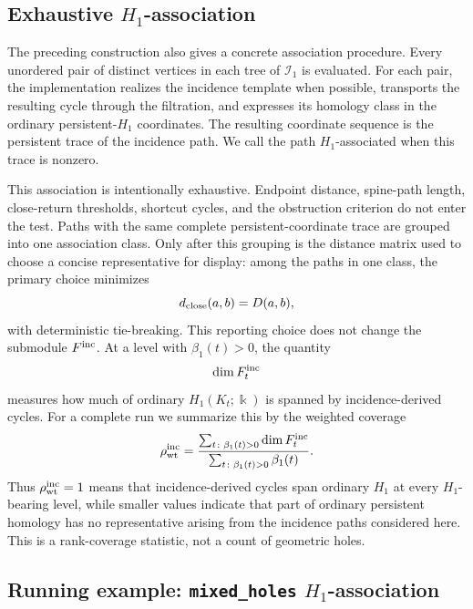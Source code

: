 \documentclass[a4paper,11pt]{article}
\theoremstyle{definition}
\theoremstyle{remark}
\begin{document}
\subsection{Exhaustive $H_1$-association}
\label{subsec:exhaustive-h1-association}

The preceding construction also gives a concrete association procedure.  Every unordered pair of distinct vertices in each tree of $\mathcal I_1$ is evaluated. For each pair, the implementation realizes the incidence template when possible, transports the resulting cycle through the filtration, and expresses its homology class in the ordinary persistent-$H_1$ coordinates. The resulting coordinate sequence is the persistent trace of the incidence path. We call the path $H_1$-associated when this trace is nonzero.

This association is intentionally exhaustive. Endpoint distance, spine-path length, close-return thresholds, shortcut cycles, and the obstruction criterion do not enter the test.  Paths with the same complete persistent-coordinate trace are grouped into one association class. Only after this grouping is the distance matrix used to choose a concise representative for display: among the paths in one class, the primary choice minimizes
$$
d_{\rm close}(a,b)=D(a,b),
$$
with deterministic tie-breaking. This reporting choice does not change the submodule $F^{\rm inc}$. At a level with $\beta_1(t)>0$, the quantity
$$
\dim F_t^{\rm inc}
$$
measures how much of ordinary $H_1(K_t;\Bbbk)$ is spanned by incidence-derived cycles. For a complete run we summarize this by the weighted coverage
$$
\rho_{\rm wt}^{\rm inc} = \frac{\sum_{t\colon\beta_1(t)>0}\dim F_t^{\rm inc}}{\sum_{t\colon\beta_1(t)>0}\beta_1(t)}.
$$
Thus $\rho_{\rm wt}^{\rm inc}=1$ means that incidence-derived cycles span ordinary $H_1$ at every $H_1$-bearing level, while smaller values indicate that part of ordinary persistent homology has no representative arising from the incidence paths considered here. This is a rank-coverage statistic, not a count of geometric holes.

\subsection{Running example: \texttt{mixed\_holes} $H_1$-association}
\label{subsec:mixed-holes-h1-association}
\end{document}
